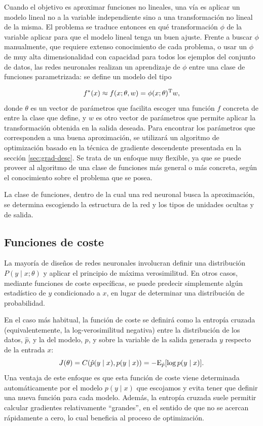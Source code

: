 Cuando el objetivo es aproximar funciones no lineales, una vía es
aplicar un modelo lineal no a la variable independiente sino a una
transformación no lineal de la misma. El problema se traduce entonces en
qué transformación \(\phi\) de la variable aplicar para que el modelo
lineal tenga un buen ajuste. Frente a buscar \(\phi\) manualmente, que
requiere extenso conocimiento de cada problema, o usar un \(\phi\) de
muy alta dimensionalidad con capacidad para todos los ejemplos del
conjunto de datos, las redes neuronales realizan un aprendizaje de
\(\phi\) entre una clase de funciones parametrizada: se define un modelo
del tipo

\begin{equation}
  f^{*}(x)\approx f(x;\theta,w)=\phi(x;\theta)^{\mathrm{T}}w, 
\end{equation}
donde \(\theta\) es un vector de parámetros que facilita escoger una
función \(f\) concreta de entre la clase que define, y \(w\) es otro
vector de parámetros que permite aplicar la transformación obtenida en
la salida deseada. Para encontrar los parámetros que corresponden a una
buena aproximación, se utilizará un algoritmo de optimización basado en
la técnica de gradiente descendente presentada en la sección
\ref{sec:grad-desc}. Se trata de un enfoque muy flexible, ya que se
puede proveer al algoritmo de una clase de funciones más general o más
concreta, según el conocimiento sobre el problema que se posea.

La clase de funciones, dentro de la cual una red neuronal busca la
aproximación, se determina escogiendo la estructura de la red y los
tipos de unidades ocultas y de salida.

\subsection{Funciones de coste}\label{sec:funciones-de-coste}

La mayoría de diseños de redes neuronales involucran definir una
distribución \(P(y\mid x;\theta)\) y aplicar el principio de máxima
verosimilitud. En otros casos, mediante funciones de coste específicas,
se puede predecir simplemente algún estadístico de \(y\) condicionado a
\(x\), en lugar de determinar una distribución de probabilidad.

En el caso más habitual, la función de coste se definirá como la
entropía cruzada (equivalentemente, la log-verosimilitud negativa) entre
la distribución de los datos, \(\hat p\), y la del modelo, \(p\), y
sobre la variable de la salida generada \(y\) respecto de la entrada
\(x\):
\[J(\theta)=C(\hat p(y\mid x), p(y\mid x))=-\mathrm{E}_{\hat p}[\log p(y\mid x)].\]
Una ventaja de este enfoque es que esta función de coste viene determinada
automáticamente por el modelo \(p(y\mid x)\) que escojamos y evita tener
que definir una nueva función para cada modelo. Además, la entropía
cruzada suele permitir calcular gradientes relativamente ``grandes'', en
el sentido de que no se acercan rápidamente a cero, lo cual beneficia al
proceso de optimización.

